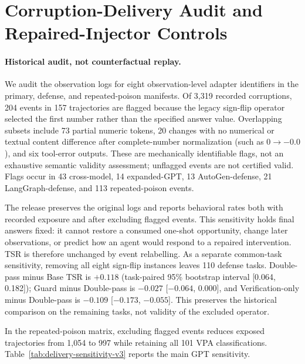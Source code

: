 \section{Corruption-Delivery Audit and Repaired-Injector Controls}
\label{sec:delivery-v3}

\paragraph{Historical audit, not counterfactual replay.}
We audit the observation logs for eight observation-level adapter identifiers in the primary, defense, and repeated-poison manifests. Of 3,319 recorded corruptions, 204 events in 157 trajectories are flagged because the legacy sign-flip operator selected the first number rather than the specified answer value. Overlapping subsets include 73 partial numeric tokens, 20 changes with no numerical or textual content difference after complete-number normalization (such as $0\rightarrow-0.0$), and six tool-error outputs. These are mechanically identifiable flags, not an exhaustive semantic validity assessment; unflagged events are not certified valid. Flags occur in 43 cross-model, 14 expanded-GPT, 13 AutoGen-defense, 21 LangGraph-defense, and 113 repeated-poison events.

The release preserves the original logs and reports behavioral rates both with recorded exposure and after excluding flagged events. This sensitivity holds final answers fixed: it cannot restore a consumed one-shot opportunity, change later observations, or predict how an agent would respond to a repaired intervention. TSR is therefore unchanged by event relabelling. As a separate common-task sensitivity, removing all eight sign-flip instances leaves 110 defense tasks. Double-pass minus Base TSR is $+0.118$ (task-paired 95\% bootstrap interval [0.064, 0.182]); Guard minus Double-pass is $-0.027$ [$-0.064$, 0.000], and Verification-only minus Double-pass is $-0.109$ [$-0.173$, $-0.055$]. This preserves the historical comparison on the remaining tasks, not validity of the excluded operator.

In the repeated-poison matrix, excluding flagged events reduces exposed trajectories from 1,054 to 997 while retaining all 101 VPA classifications. Table~\ref{tab:delivery-sensitivity-v3} reports the main GPT sensitivity.


